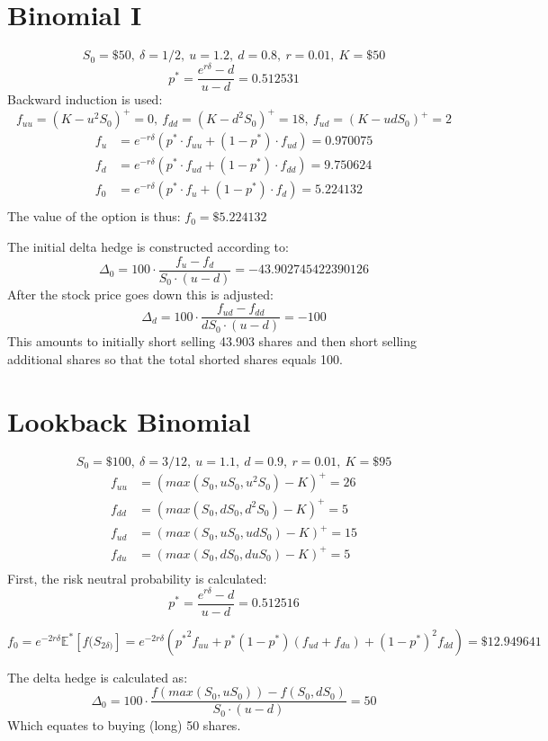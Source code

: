 \documentclass{article}
\begin{document}
\thispagestyle{fancy}

\section{Binomial I}

$$S_0 = \$50, \ \delta=1/2, \ u=1.2, \ d=0.8, \ r=0.01, \ K=\$50$$
$$p^* = \frac{e^{r \delta} - d}{u - d} = 0.512531$$
Backward induction is used:
$$f_{uu} = (K - u^2S_0)^+ = 0, \ f_{dd} = (K-d^2S_0)^+ = 18, \ f_{ud} = (K - udS_0)^+ = 2$$
\begin{align*}
	f_u &= e^{-r\delta}\left(p^* \cdot f_{uu} + (1-p^*) \cdot f_{ud}\right) = 0.970075\\
	f_d &= e^{-r\delta}\left(p^* \cdot f_{ud} + (1-p^*) \cdot f_{dd}\right) = 9.750624\\
	f_0 &= e^{-r\delta}\left(p^* \cdot f_{u} + (1-p^*) \cdot f_{d}\right) = 5.224132\\
\end{align*}
The value of the option is thus: $f_0 = \$5.224132$

The initial delta hedge is constructed according to:
$$\Delta_0 = 100 \cdot \frac{f_u-f_d}{S_0 \cdot (u-d)} = -43.902745422390126$$
After the stock price goes down this is adjusted:
$$\Delta_d = 100 \cdot \frac{f_{ud}-f_{dd}}{dS_0 \cdot (u-d)} = -100$$
This amounts to initially short selling 43.903 shares and then short selling additional shares so that the total shorted shares equals 100.

\section{Lookback Binomial}
$$S_0 = \$100, \ \delta=3/12, \ u=1.1, \ d=0.9, \ r=0.01, \ K=\$95$$
\begin{align*}
	f_{uu} &= (max(S_0, uS_0, u^2S_0) - K)^+ = 26\\
	f_{dd} &= (max(S_0, dS_0, d^2S_0) - K)^+ = 5\\
	f_{ud} &= (max(S_0, uS_0, udS_0) - K)^+ = 15\\
	f_{du} &= (max(S_0, dS_0, duS_0) - K)^+ = 5\\
\end{align*}
First, the risk neutral probability is calculated:
$$p^* = \frac{e^{r\delta}-d}{u-d} = 0.512516$$

$$f_0 = e^{-2r\delta}\mathbb{E}^*\left[f(S_{2\delta)}\right] = e^{-2r\delta}\left({p^*}^2f_{uu} + p^*(1-p^*)(f_{ud} + f_{du}) + (1-p^*)^2f_{dd}\right) = \$12.949641$$

The delta hedge is calculated as:
$$\Delta_0 = 100 \cdot \frac{f(max(S_0, uS_0))-f(S_0, dS_0)}{S_0 \cdot (u-d)} = 50$$
Which equates to buying (long) 50 shares.
\end{document}
